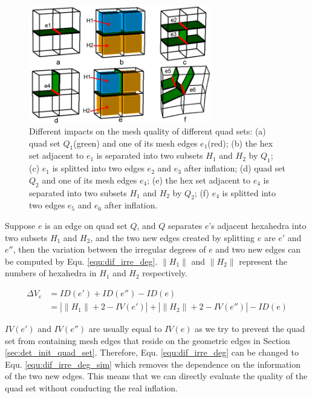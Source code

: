 \documentclass[final,5p,times,twocolumn]{elsarticle}
\begin{document}
\begin{figure}[htbp]
\begin{center}
\includegraphics[width=8cm]{quality_impact_qs.png}
\caption{Different impacts on the mesh quality of different quad sets: (a) quad set $Q_1$(green) and one of its mesh edges $e_1$(red); (b) the hex set adjacent to $e_1$ is separated into two subsets $H_1$ and $H_2$ by $Q_1$; (c) $e_1$ is splitted into two edges $e_2$ and $e_3$ after inflation; (d) quad set $Q_2$ and one of its mesh edges $e_4$; (e) the hex set adjacent to $e_4$ is separated into two subsets $H_1$ and $H_2$ by $Q_2$; (f) $e_4$ is splitted into two edges $e_5$ and $e_6$ after inflation.}
\label{fig:quality_impact_qs}
\end{center}
\end{figure}

Suppose $e$ is an edge on quad set $Q$, and $Q$ separates $e$'s adjacent hexahedra into two subsets $H_1$ and $H_2$, and the two new edges created by splitting $e$ are $e'$ and $e''$, then the variation between the irregular degrees of $e$ and two new edges can be computed by Equ. \ref{equ:dif_irre_deg}. $\left \| H_1 \right \|$ and $\left \| H_2 \right \|$ represent the numbers of hexahedra in $H_1$ and $H_2$ respectively. 

\begin{equation}
\label{equ:dif_irre_deg}
\begin{aligned}
\Delta V_e &= ID(e') + ID(e'') - ID(e) \\
&= |\left \| H_1 \right \| + 2 - IV(e')| + |\left \| H_2 \right \| + 2 - IV(e'')| - ID(e)
\end{aligned}
\end{equation}

$IV(e')$ and $IV(e'')$ are usually equal to $IV(e)$ as we try to prevent the quad set from containing mesh edges that reside on the geometric edges in Section \ref{sec:det_init_quad_set}. Therefore, Equ. \ref{equ:dif_irre_deg} can be changed to Equ. \ref{equ:dif_irre_deg_sim} which removes the dependence on the information of the two new edges. This means that we can directly evaluate the quality of the quad set without conducting the real inflation.
\end{document}
